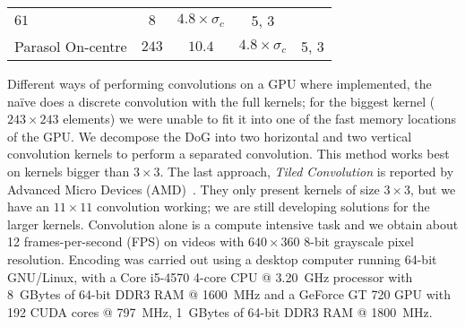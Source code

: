 \begin{table}[htb]
\begin{tabular}{l c c c c}
      \begin{minipage}{1cm}\centering $61$ \end{minipage}& 
      $8$ & $4.8 \times \sigma_c$ & 5, 3 \\
      \begin{minipage}{3cm} Parasol On-centre \vspace*{0.005cm}\end{minipage} & 
      \begin{minipage}{0.5cm}\centering $243$\end{minipage} &
      $10.4$ & $4.8 \times \sigma_c$ & 5, 3
    \end{tabular}
    \label{tab-kernel-specs}
  \egroup
  \vspace*{-5pt}
\end{table}
Different ways of performing convolutions on a GPU where implemented, the naïve
does a discrete convolution with the full kernels; for the biggest kernel 
($243\times243$ elements) we were unable to fit it into one of the fast memory
locations of the GPU. We decompose the DoG into two horizontal and two vertical
convolution kernels to perform a separated convolution. This method works best 
on kernels bigger than $3\times3$. The last approach, \emph{Tiled Convolution} 
is reported by Advanced Micro Devices (AMD)~\cite{tiled-convolution}. They only 
present kernels of size $3\times3$, but we have an $11\times11$ convolution 
working; we are still developing solutions for the larger kernels.
Convolution alone is a compute intensive task and we 
obtain about 12 frames-per-second (FPS) on videos with $640\times360$ 8-bit 
grayscale pixel resolution. Encoding was carried out using a desktop computer 
running 64-bit GNU/Linux, with a Core i5-4570 4-core CPU @ 3.20~GHz processor 
with 8~GBytes of 64-bit DDR3 RAM @ 1600~MHz and a GeForce GT 720 GPU with 192 
CUDA cores @ 797~MHz, 1~GBytes of 64-bit DDR3 RAM @ 1800~MHz. %

